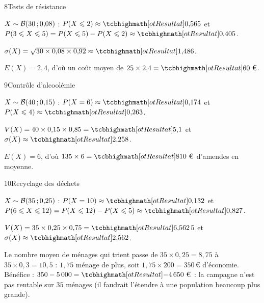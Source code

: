 \begin{corrige}{8}{Tests de résistance}
\begin{questions}
  \item $X\sim\mathcal{B}(30\,{;}\,0{,}08)$ : $P(X\leq2)\approx\res{0{,}565}$ et $P(3\leq X\leq5)=P(X\leq5)-P(X\leq2)\approx\res{0{,}405}$.
  \item $\sigma(X)=\sqrt{30\times0{,}08\times0{,}92}\approx\res{1{,}486}$.
  \item $E(X)=2{,}4$, d'où un coût moyen de $25\times2{,}4=\res{60\text{ €}}$.
\end{questions}
\end{corrige}

\begin{corrige}{9}{Contrôle d'alcoolémie}
\begin{questions}
  \item $X\sim\mathcal{B}(40\,{;}\,0{,}15)$ : $P(X=6)\approx\res{0{,}174}$ et $P(X\leq4)\approx\res{0{,}263}$.
  \item $V(X)=40\times0{,}15\times0{,}85=\res{5{,}1}$ et $\sigma(X)\approx\res{2{,}258}$.
  \item $E(X)=6$, d'où $135\times6=\res{810\text{ €}}$ d'amendes en moyenne.
\end{questions}
\end{corrige}

\begin{corrige}{10}{Recyclage des déchets}
\begin{questions}
  \item $X\sim\mathcal{B}(35\,{;}\,0{,}25)$ : $P(X=10)\approx\res{0{,}132}$ et $P(6\leq X\leq12)=P(X\leq12)-P(X\leq5)\approx\res{0{,}827}$.
  \item $V(X)=35\times0{,}25\times0{,}75=\res{6{,}562\,5}$ et $\sigma(X)\approx\res{2{,}562}$.
  \item Le nombre moyen de ménages qui trient passe de $35\times0{,}25=8{,}75$ à $35\times0{,}3=10{,}5$ : $1{,}75$ ménage de plus, soit
    $1{,}75\times200=350$\,€ d'économie. Bénéfice : $350-5\,000=\res{-4\,650\text{ €}}$ : la campagne n'est pas rentable sur $35$ ménages
    (il faudrait l'étendre à une population beaucoup plus grande).
\end{questions}
\end{corrige}

